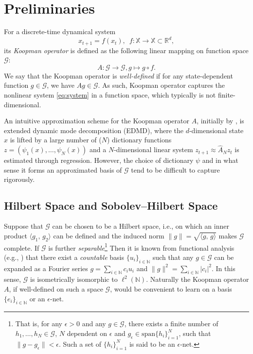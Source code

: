 \documentclass[english]{cccconf}
\renewcommand{\emph}[1]{\textit{#1}}
\newcommand{\mc}[1]{\mathcal{#1}}
\newcommand{\mr}[1]{\mathrm{#1}}
\newcommand{\mbb}[1]{\mathds{#1}} %
\newcommand{\mR}{\mbb{R}}
\newcommand{\mN}{\mbb{N}}
\newcommand{\mX}{\mbb{X}}
\newcommand{\ip}[2]{\langle #1, \, #2 \rangle}
\begin{document}
\section{Preliminaries}\label{sec:preliminaries}
For a discrete-time dynamical system 
\begin{equation}\label{eq:system}
    x_{t+1} = f(x_t), \enspace f: \mX\rightarrow \mX \subset \mR^{d}, 
\end{equation}
its \emph{Koopman operator} is defined as the following linear mapping on function space $\mc{G}$: 
\begin{equation}\label{eq:Koopman}
    A: \mc{G}\rightarrow \mc{G}, g \mapsto g \circ f. 
\end{equation}
We say that the Koopman operator is \emph{well-defined} if for any state-dependent function $g\in \mc{G}$, we have $Ag\in \mc{G}$. As such, Koopman operator captures the nonlinear system \eqref{eq:system} in a function space, which typically is not finite-dimensional. 
\par An intuitive approximation scheme for the Koopman operator $A$, initially by \cite{william2015data}, is extended dynamic mode decomposition (EDMD), where the $d$-dimensional state $x$ is lifted by a large number of ($N$) dictionary functions $z=(\psi_1(x), \dots, \psi_N(x))$ and a $N$-dimensional linear system $z_{t+1} \approx \hat{A}_Nz_t$ is estimated through regression. 
However, the choice of dictionary $\psi$ and in what sense it forms an approximated basis of $\mc{G}$ tend to be difficult to capture rigorously. 


\subsection{Hilbert Space and Sobolev--Hilbert Space}
\par Suppose that $\mc{G}$ can be chosen to be a Hilbert space, i.e., on which an inner product $\ip{g_1}{g_2}$ can be defined and the induced norm $\|g\|=\sqrt{\ip{g}{g}}$ makes $\mc{G}$ complete. 
If $\mc{G}$ is further \emph{separable}\footnote{That is, for any $\epsilon>0$ and any $g\in \mc{G}$, there exists a finite number of $h_1,\dots,h_N\in \mc{G}$, $N$ dependent on $\epsilon$ and $g_\epsilon \in \mr{span}\{h_i\}_{i=1}^N$, such that $\|g-g_\epsilon\|<\epsilon$. Such a set of $\{h_i\}_{i=1}^N$ is said to be an $\epsilon$-net.} Then it is known from functional analysis (e.g., \cite{zhang2021lectures}) that there exist a \emph{countable} basis $\{u_i\}_{i\in \mN}$ such that any $g\in \mc{G}$ can be expanded as a Fourier series $g = \sum_{i\in \mN} c_iu_i$ and $\|g\|^2 = \sum_{i\in \mN} |c_i|^2$. 
In this sense, $\mc{G}$ is isometrically isomorphic to $\ell^2(\mN)$. Naturally the Koopman operator $A$, if well-defined on such a space $\mc{G}$, would be convenient to learn on a basis $\{e_i\}_{i\in \mN}$ or an $\epsilon$-net.
\end{document}
